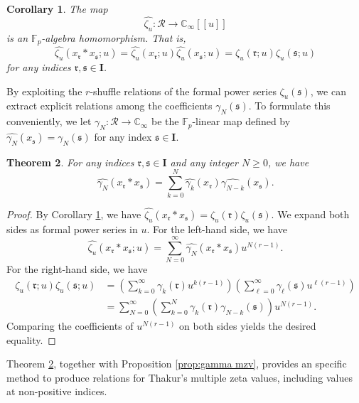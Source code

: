 \documentclass[12pt,reqno]{amsart}
\numberwithin{equation}{section}
\theoremstyle{plain}
\newtheorem{thm}{Theorem}[section]
\newtheorem{cor}[thm]{Corollary}
\theoremstyle{definition}
\theoremstyle{remark}
\newcommand{\CC}{\mathbb{C}}
\newcommand{\FF}{\mathbb{F}}
\newcommand{\Rcal}{\mathcal{R}}
\newcommand{\mbb}[1]{[\![{#1}]\!]}
\newcommand{\ww}[1]{\mathfrak{#1}}
\newcommand{\Ical}{\mathbf{I}}
\begin{document}
\begin{cor}\label{cor:zeta u shuffle formal}
    The map $$\widehat{\zeta_u}:\Rcal\to\CC_\infty\mbb{u}$$ is an $\FF_p$-algebra homomorphism. That is,
    $$\widehat{\zeta_u}(x_{\ww{r}}\ast x_{\ww{s}};u) =\widehat{\zeta_u}(x_{\ww{r}};u)\widehat{\zeta_u}(x_{\ww{s}};u)=\zeta_u(\ww{r};u)\zeta_u(\ww{s};u)$$
    for any indices $\ww{r},\ww{s}\in\Ical$.
\end{cor}

By exploiting the $r$-shuffle relations of the formal power series $\zeta_u(\ww{s})$, we can extract explicit relations among the coefficients $\gamma_N(\ww{s})$. To formulate this conveniently, we let $\widehat{\gamma_N}: \Rcal \to \CC_\infty$ be the $\FF_p$-linear map defined by $\widehat{\gamma_N}(x_{\ww{s}}) = \gamma_N(\ww{s})$ for any index $\ww{s} \in \Ical$.

\begin{thm}\label{thm:gamma_shuffle}
    For any indices $\ww{r}, \ww{s} \in \Ical$ and any integer $N \ge 0$, we have 
    $$\widehat{\gamma_N}(x_{\ww{r}} \ast x_{\ww{s}}) = \sum_{k=0}^N \widehat{\gamma_k}(x_{\ww{r}}) \widehat{\gamma_{N-k}}(x_{\ww{s}}).$$
\end{thm}

\begin{proof}
    By Corollary \ref{cor:zeta u shuffle formal}, we have $\widehat{\zeta_u}(x_{\ww{r}} \ast x_{\ww{s}}) = \zeta_u(\ww{r}) \zeta_u(\ww{s})$. We expand both sides as formal power series in $u$. For the left-hand side, we have
    $$\widehat{\zeta_u}(x_{\ww{r}} \ast x_{\ww{s}}; u) = \sum_{N=0}^{\infty} \widehat{\gamma_N}(x_{\ww{r}} \ast x_{\ww{s}}) u^{N(r-1)}.$$
    For the right-hand side, we have
    \begin{align*}
        \zeta_u(\ww{r}; u) \zeta_u(\ww{s}; u) &= \left( \sum_{k=0}^{\infty} \gamma_k(\ww{r}) u^{k(r-1)} \right) \left( \sum_{\ell=0}^{\infty} \gamma_\ell(\ww{s}) u^{\ell(r-1)} \right) \\
        &= \sum_{N=0}^{\infty} \left( \sum_{k=0}^N \gamma_k(\ww{r}) \gamma_{N-k}(\ww{s}) \right) u^{N(r-1)}.
    \end{align*}
    Comparing the coefficients of $u^{N(r-1)}$ on both sides yields the desired equality.
\end{proof}

Theorem \ref{thm:gamma_shuffle}, together with Proposition \ref{prop:gamma mzv}, provides an specific method to produce relations for Thakur's multiple zeta values, including values at non-positive indices.
\end{document}

